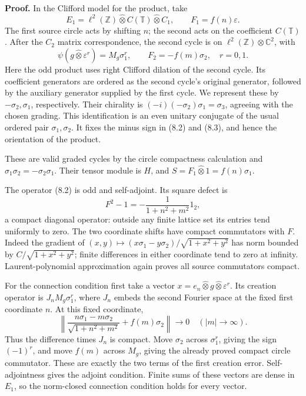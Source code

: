 \documentclass[
  11pt,
]{article}
\begin{document}
\textbf{Proof.} In the Clifford model for the product, take \[
E_1=\ell^2(\mathbb Z)\widehat\otimes C(\mathbb T)
\widehat\otimes C_1,\qquad
F_1=f(n)\varepsilon.
\] The first source circle acts by shifting \(n\); the second acts on
the coefficient \(C(\mathbb T)\). After the \(C_2\) matrix
correspondence, the second cycle is on
\(\ell^2(\mathbb Z)\otimes\mathbb C^2\), with \[
\psi(g\widehat\otimes\varepsilon^r)=M_g\sigma_1^r,
\qquad F_2=-f(m)\sigma_2,\quad r=0,1.
\tag{8.3}
\] Here the odd product uses right Clifford dilation of the second
cycle. Its coefficient generators are ordered as the second cycle's
original generator, followed by the auxiliary generator supplied by the
first cycle. We represent these by \(-\sigma_2,\sigma_1\), respectively.
Their chirality is \((-i)(-\sigma_2)\sigma_1=\sigma_3\), agreeing with
the chosen grading. This identification is an even unitary conjugate of
the usual ordered pair \(\sigma_1,\sigma_2\). It fixes the minus sign in
(8.2) and (8.3), and hence the orientation of the product.

These are valid graded cycles by the circle compactness calculation and
\(\sigma_1\sigma_2=-\sigma_2\sigma_1\). Their tensor module is \(H\),
and \(S=F_1\widehat\otimes1=f(n)\sigma_1\).

The operator (8.2) is odd and self-adjoint. Its square defect is \[
F^2-1=-\frac{1}{1+n^2+m^2}1_2,
\] a compact diagonal operator: outside any finite lattice set its
entries tend uniformly to zero. The two coordinate shifts have compact
commutators with \(F\). Indeed the gradient of
\((x,y)\mapsto(x\sigma_1-y\sigma_2)/\sqrt{1+x^2+y^2}\) has norm bounded
by \(C/\sqrt{1+x^2+y^2}\); finite differences in either coordinate tend
to zero at infinity. Laurent-polynomial approximation again proves all
source commutators compact.

For the connection condition first take a vector
\(x=e_n\widehat\otimes g\widehat\otimes\varepsilon^r\). Its creation
operator is \(J_nM_g\sigma_1^r\), where \(J_n\) embeds the second
Fourier space at the fixed first coordinate \(n\). At this fixed
coordinate, \[
\left\|
\frac{n\sigma_1-m\sigma_2}{\sqrt{1+n^2+m^2}}
+f(m)\sigma_2
\right\|\longrightarrow0
\quad(|m|\longrightarrow\infty).
\tag{8.4}
\] Thus the difference times \(J_n\) is compact. Move \(\sigma_2\)
across \(\sigma_1^r\), giving the sign \((-1)^r\), and move \(f(m)\)
across \(M_g\), giving the already proved compact circle commutator.
These are exactly the two terms of the first creation error.
Self-adjointness gives the adjoint condition. Finite sums of these
vectors are dense in \(E_1\), so the norm-closed connection condition
holds for every vector.
\end{document}
